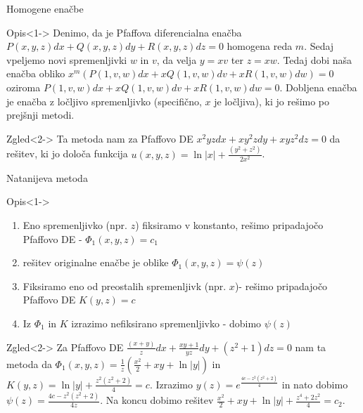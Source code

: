 \documentclass[t, 8pt]{beamer} %
\newcommand{\abs}[1]{\ensuremath{\lvert #1 \rvert}}
\newcommand{\fillblack}[1]{
	\begin{tikzpicture}[remember picture, overlay]
		\node [shift={(0 cm,0cm)}]  at (current page.south west)
		{%
			\begin{tikzpicture}[remember picture, overlay] at (current page.south west)
				\draw [fill=black] (0, 0) -- (0,#1 \paperheight) --
				(\paperwidth,#1 \paperheight) -- (\paperwidth,0) -- cycle ;
			\end{tikzpicture}
		};
		\draw (current page.north west) rectangle (current page.south east);
	\end{tikzpicture}
}
\begin{document}
		\begin{frame}{Homogene enačbe}
			\begin{block}{Opis}<1->
					Denimo, da je Pfaffova diferencialna enačba $P(x, y, z)dx + Q(x, y, z)dy + R(x, y, z)dz = 0$ homogena reda $m$. Sedaj vpeljemo novi spremenljivki $w$ in $v$, da velja $y = xv$ ter $z = xw$. Tedaj dobi naša enačba obliko $x^m(P(1, v, w)dx + xQ(1, v, w)dv + xR(1, v, w)dw) = 0$ oziroma $P(1, v, w)dx + xQ(1, v, w)dv + xR(1, v, w)dw = 0$. Dobljena enačba je enačba z ločljivo spremenljivko (specifično, $x$ je ločljiva), ki jo rešimo po prejšnji metodi.
			\end{block}
			\begin{block}{Zgled}<2->
				 Ta metoda nam za Pfaffovo DE $x^2yzdx + xy^2zdy + xyz^2dz = 0$ da rešitev, ki jo določa funkcija $u(x, y, z) = \ln\abs{x} + \frac{(y^2 + z^2)}{2x^2}$.
			\end{block}
		\end{frame}
		
		\begin{frame}{Natanijeva metoda}
			\begin{block}{Opis}<1->
				\begin{enumerate}
					\item Eno spremenljivko (npr. $z$) fiksiramo v konstanto, rešimo pripadajočo Pfaffovo DE - $\Phi_1(x, y, z) = c_1$
					\item rešitev originalne enačbe je oblike $\Phi_1(x, y, z) = \psi(z)$
					\item Fiksiramo eno od preostalih spremenljivk (npr. $x$)- rešimo pripadajočo Pfaffovo DE $K(y, z) = c$
					\item Iz $\Phi_1$ in $K$ izrazimo nefiksirano spremenljivko - dobimo $\psi(z)$
				\end{enumerate}
			\end{block}
			\begin{block}{Zgled}<2->
				Za Pfaffovo DE $\frac{(x+y)}{z}dx + \frac{xy+1}{yz}dy + (z^2 + 1)dz = 0$ nam ta metoda da $\Phi_1(x, y, z) =\frac{1}{z}(\frac{x^2}{2} + xy + \ln\abs{y})$ in $K(y, z) = \ln\abs{y} + \frac{z^2(z^2 + 2)}{4}=c$. Izrazimo $y(z) = e^{\frac{4c - z^2(z^2 + 2)}{4}}$ in nato dobimo $\psi(z) = \frac{4c - z^2(z^2 + 2)}{4z}$. Na koncu dobimo rešitev $\frac{x^2}{2} + xy + \ln\abs{y} + \frac{z^4 + 2z^2}{4} = c_2$.
			\end{block}
		\end{frame}
		
\end{document}
